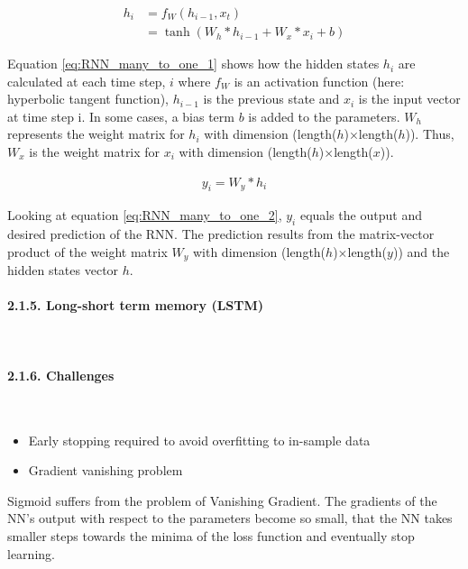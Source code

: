 \documentclass[
]{article}
\begin{document}
\begin{align} \label{eq:RNN_many_to_one_1}
  h_{i} & = f_{W}(h_{i-1}, x_{t}) \\
  & = \tanh(W_{h}*h_{i-1} + W_{x}*x_{i} + b) \nonumber 
\end{align}

Equation \ref{eq:RNN_many_to_one_1} shows how the hidden states
\(h_{i}\) are calculated at each time step, \(i\) where \(f_{W}\) is an
activation function (here: hyperbolic tangent function), \(h_{i-1}\) is
the previous state and \(x_i\) is the input vector at time step i. In
some cases, a bias term \(b\) is added to the parameters. \(W_{h}\)
represents the weight matrix for \(h_{i}\) with dimension
(length(\(h\))\(\times\)length(\(h\))). Thus, \(W_{x}\) is the weight
matrix for \(x_{i}\) with dimension
(length(\(h\))\(\times\)length(\(x\))).

\begin{align} \label{eq:RNN_many_to_one_2}
  y_{i} = W_{y}*h_{i}
\end{align}

Looking at equation \ref{eq:RNN_many_to_one_2}, \(y_{i}\) equals the
output and desired prediction of the RNN. The prediction results from
the matrix-vector product of the weight matrix \(W_{y}\) with dimension
(length(\(h\))\(\times\)length(\(y\))) and the hidden states vector
\(h\).

\hypertarget{LSTM}{%
\paragraph{2.1.5. Long-short term memory (LSTM)}\label{LSTM}}

~

\hypertarget{challenges}{%
\paragraph{2.1.6. Challenges}\label{challenges}}

~

\begin{itemize}
\item
  Early stopping required to avoid overfitting to in-sample data
\item
  Gradient vanishing problem
\end{itemize}

Sigmoid suffers from the problem of Vanishing Gradient. The gradients of
the NN's output with respect to the parameters become so small, that the
NN takes smaller steps towards the minima of the loss function and
eventually stop learning.
\end{document}

